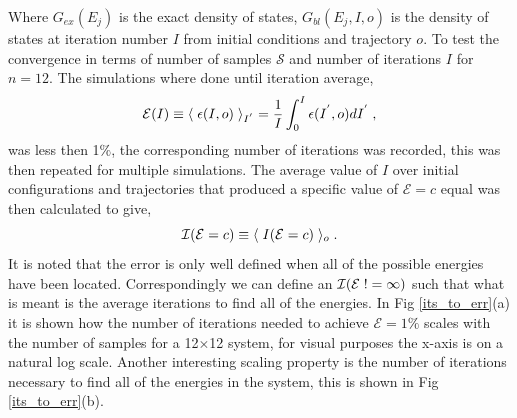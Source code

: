\documentclass[twocolumn]{article}
\begin{document}
Where $G_{ex}(E_j)$ is the exact density of states, $G_{bl}(E_j,I,o)$ is the density of states at iteration number $I$ from initial conditions and trajectory $o$.
To test the convergence in terms of number of samples $\mathcal{S}$ and number of iterations $I$ for $n=12$.  The simulations where done until iteration average,
\begin{equation}
\mathcal{E}(I) \equiv \langle \hspace{0.1cm} \epsilon(I,o)\hspace{0.1cm}\rangle_{I^{'}} = \frac{1}{I}\int_{0}^{I}\epsilon(I^{'},o)dI^{'} \;,
\end{equation}
 was less then 1$\%$, the corresponding number of iterations was recorded, this was then repeated for multiple simulations. The average value of $I$ over initial configurations and trajectories that produced a specific  value of $\mathcal{E}=c$ equal  was then calculated to give, 
\begin{equation}
 \mathcal{I}(\mathcal{E}=c) \equiv \langle \hspace{0.1cm}  I(\mathcal{E} = c) \hspace{0.1cm}\rangle_{o} \;.
 \end{equation}
 It is noted that the error is only well defined when all of the possible
 energies have been located. Correspondingly we can define an $\mathcal{I}(\mathcal{E}\hspace{0.1cm} != \infty )$ such that what is meant is the average iterations to find all of the energies. In Fig \ref{its_to_err}(a)  it is shown how the number of iterations needed to achieve $\mathcal{E}=1\%$ scales with the number of samples for a 12$\times$12 system, for visual purposes the x-axis is on a natural log scale. Another interesting scaling property is the number of iterations necessary to find all of the energies in the system, this is shown in Fig \ref{its_to_err}(b). 
\end{document}
